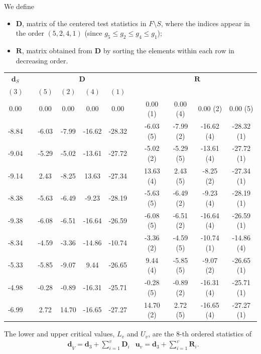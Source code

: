 \documentclass[11pt,a4paper,openright,twoside]{article}
\begin{document}
We define
\begin{itemize}
\item $\mathbf{D}$, matrix of the centered test statistics in $F\setminus S$, where the indices appear in the order $(5,2,4,1)$ (since $g_5\leq g_2\leq g_4\leq g_1$);
\item $\mathbf{R}$, matrix obtained from $\mathbf{D}$ by sorting the elements within each row in decreasing order.
\end{itemize}

\newpage
\begin{table}[h!]
\centering
\begin{tabular}{ccccccccccc}
$\mathbf{d}_S$ & & \multicolumn{4}{c}{$\mathbf{D}$} & & \multicolumn{4}{c}{$\mathbf{R}$}\\
$(3)$ &  & $(5)$ & $(2)$ & $(4)$ & $(1)$ &  &  &  &  &  \\
\cline{1-1} \cline{3-6} \cline{8-11}
0.00 &  & 0.00 & 0.00 & 0.00 & 0.00 &  & 0.00 (1)& 0.00 (4)& 0.00 (2)& 0.00 (5)\\
-8.84 &  & -6.03 & -7.99 & -16.62 & -28.32 &  & -6.03 (5)& -7.99 (2)& -16.62 (4)& -28.32 (1)\\
-9.04 &  & -5.29 & -5.02 & -13.61 & -27.72 &  & -5.02 (2)& -5.29 (5)& -13.61 (4)& -27.72 (1)\\
-9.14 &  & 2.43 & -8.25 & 13.63 & -27.34 &  & 13.63 (4)& 2.43 (5)& -8.25 (2)& -27.34 (1)\\
-8.38 &  & -5.63 & -6.49 & -9.23 & -28.19 &  & -5.63 (5)& -6.49 (2)& -9.23 (4)& -28.19 (1)\\
-9.38 &  & -6.08 & -6.51 & -16.64 & -26.59 &  & -6.08 (5)& -6.51 (2)& -16.64 (4)& -26.59 (1)\\
-8.34 &  & -4.59 & -3.36 & -14.86 & -10.74 &  & -3.36 (2)& -4.59 (5)& -10.74 (1)& -14.86 (4)\\
-5.33 &  & -5.85 & -9.07 & 9.44 & -26.65 &  & 9.44 (4)& -5.85 (5)& -9.07 (2)& -26.65 (1)\\
-4.98 &  & -0.28 & -0.89 & -16.31 & -25.71 &  & -0.28 (5)& -0.89 (2)& -16.31 (4)& -25.71 (1)\\
-6.99 &  & 2.72 & 14.70 & -16.65 & -27.27 &  & 14.70 (2)& 2.72 (5)& -16.65 (4) & -27.27 (1)
\end{tabular}
\end{table}

The lower and upper critical values, $L_v$ and $U_v$, are the 8-th ordered statistics of
\begin{align*}
& \mathbf{d}_{\tilde{V}}=\mathbf{d}_3 + \sum_{i=1}^v \mathbf{D}_i & \mathbf{u}_v=\mathbf{d}_3 + \sum_{i=1}^v \mathbf{R}_i.
\end{align*}
\end{document}
